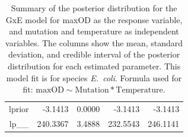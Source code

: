 \begin{table}[ht]
\begin{tabular}{rrrrr}
  lprior & -3.1413 & 0.0000 & -3.1413 & -3.1413 \\ 
  lp\_\_ & 240.3367 & 3.4888 & 232.5543 & 246.1141 \\ 
   \hline
\end{tabular}
\caption{Summary of the posterior distribution for the GxE model for maxOD as the response variable, and mutation and temperature as independent variables. The columns show the mean, standard deviation, and credible interval of the posterior distribution for each estimated parameter. This model fit is for species \textit{E.~coli}.  Formula used for fit: $\text{maxOD} \sim \text{Mutation} * \text{Temperature}$.} 
\label{supptab:GxE_maxOD_Ecoli}
\end{table}



